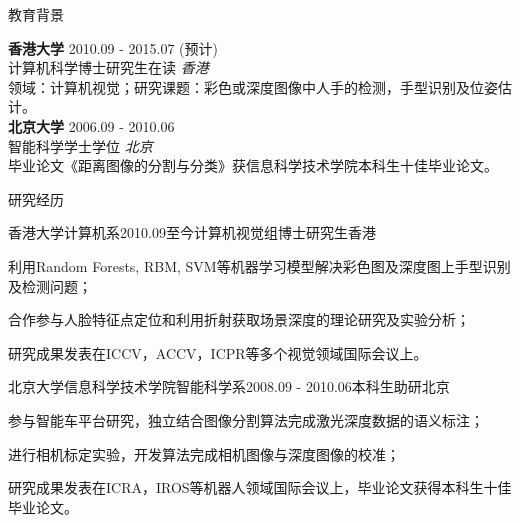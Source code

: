 \documentclass{cv_professional-cn} %
\begin{document}

\begin{rSection}{教育背景}

{\bf 香港大学} \hfill 2010.09 - 2015.07 (预计) \\ 
计算机科学博士研究生在读 \hfill {\em 香港}\smallskip \vspace{-0.25em}\\
领域：计算机视觉；研究课题：彩色或深度图像中人手的检测，手型识别及位姿估计。\hfill \smallskip \\
{\bf 北京大学} \hfill 2006.09 - 2010.06 \\ 
智能科学学士学位 \hfill {\em 北京} \smallskip \vspace{-0.25em}\\
毕业论文《距离图像的分割与分类》获信息科学技术学院本科生十佳毕业论文。 \hfill

\end{rSection}


\begin{rSection}{研究经历}
    
\begin{rSubsection}{香港大学计算机系}{2010.09至今}{计算机视觉组博士研究生}{香港}
	\item 利用Random Forests, RBM, SVM等机器学习模型解决彩色图及深度图上手型识别及检测问题；
	\item 合作参与人脸特征点定位和利用折射获取场景深度的理论研究及实验分析；
	\item 研究成果发表在ICCV，ACCV，ICPR等多个视觉领域国际会议上。
\end{rSubsection}

\begin{rSubsection}{北京大学信息科学技术学院智能科学系}{2008.09 - 2010.06}{本科生助研}{北京}
    \item 参与智能车平台研究，独立结合图像分割算法完成激光深度数据的语义标注；
    \item 进行相机标定实验，开发算法完成相机图像与深度图像的校准；
    \item 研究成果发表在ICRA，IROS等机器人领域国际会议上，毕业论文获得本科生十佳毕业论文。
\end{rSubsection}

\end{rSection}
\end{document}
